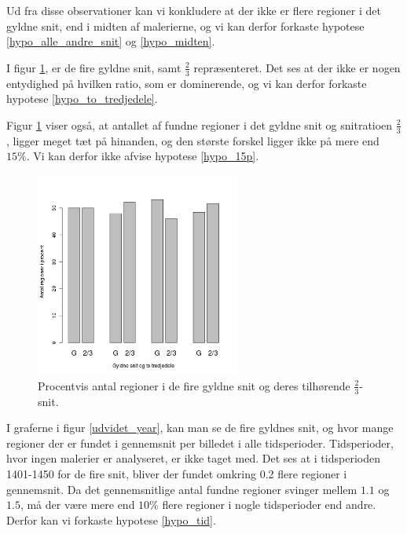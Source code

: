 {Ud fra disse observationer kan vi konkludere at der ikke er flere
regioner i det gyldne snit, end i midten af malerierne, og vi kan derfor
forkaste hypotese \ref{hypo_alle_andre_snit} og \ref{hypo_midten}.

I figur \ref{G_vs_to_trejedele_udvidet}, er de fire gyldne snit, samt
$\frac{2}{3}$ repræsenteret. Det ses at der ikke er nogen entydighed på
hvilken ratio, som er dominerende, og vi kan derfor forkaste hypotese
\ref{hypo_to_tredjedele}.

Figur \ref{G_vs_to_trejedele_udvidet} viser også, at antallet af fundne
regioner i det gyldne snit og
snitratioen $\frac{2}{3}$, ligger meget tæt på hinanden, og den største
forskel ligger ikke på mere end $15\%$. Vi kan derfor ikke afvise
hypotese \ref{hypo_15p}.

\begin{figure}[h!]
	\begin{center}
		\includegraphics[width=0.6\textwidth]{afsnit/resultater/billeder/G_vs_to_tredjedeleU.png}
	\end{center}
	\caption{Procentvis antal regioner i de fire gyldne snit og deres
    tilhørende $\frac{2}{3}$-snit.}
	\label{G_vs_to_trejedele_udvidet}
\end{figure}

I graferne i figur \ref{udvidet_year}, kan man se de fire gyldnes snit,
og hvor mange regioner der er fundet i gennemsnit per billedet i alle
tidsperioder. Tidsperioder, hvor ingen malerier er analyseret, er ikke
taget med. Det ses at i tidsperioden 1401-1450 for de fire snit,
bliver der fundet omkring 0.2 flere regioner i gennemsnit. 
Da det gennemsnitlige antal fundne regioner svinger mellem $1.1$ og
$1.5$, må der være mere end $10\%$ flere regioner i nogle tidsperioder
end andre. Derfor kan vi forkaste hypotese \ref{hypo_tid}.

}

